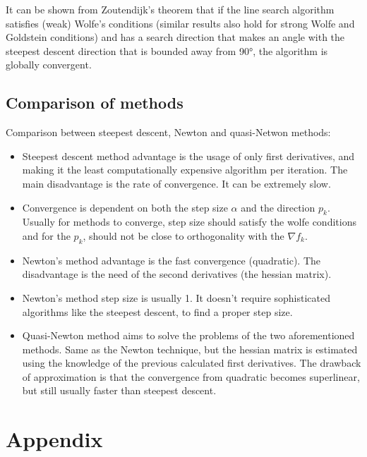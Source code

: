 \documentclass[a4paper,11pt]{article}
\numberwithin{equation}{section} %
\begin{document}
It can be shown from Zoutendijk's theorem that if the line search algorithm satisfies (weak) Wolfe's conditions (similar results also hold for strong Wolfe and Goldstein conditions) and has a search direction that makes an angle with the steepest descent direction that is bounded away from 90°, the algorithm is globally convergent.

\subsection{Comparison of methods}

Comparison between steepest descent, Newton and quasi-Netwon methods:

\begin{itemize}
    \item Steepest descent method advantage is the usage of only first derivatives, and making it the least computationally expensive algorithm per iteration. The main disadvantage is the rate of convergence. It can be extremely slow.

    \item Convergence is dependent on both the step size $\alpha$ and the direction $p_k$. Usually for methods to converge, step size should satisfy the wolfe conditions and for the $p_k$, should not be close to orthogonality with the $\nabla f_k$.

    \item Newton's method advantage is the fast convergence (quadratic). The disadvantage is the need of the second derivatives (the hessian matrix).

    \item Newton's method step size is usually 1. It doesn't require sophisticated algorithms like the steepest descent, to find a proper step size.

    \item Quasi-Newton method aims to solve the problems of the two aforementioned methods. Same as the Newton technique, but the hessian matrix is estimated using the knowledge of the previous calculated first derivatives. The drawback of approximation is that the convergence from quadratic becomes superlinear, but still usually faster than steepest descent.

\end{itemize}

\label{appendix}
\section{Appendix}






\end{document}
